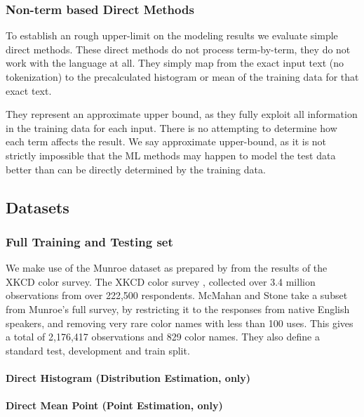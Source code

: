 \documentclass[11pt,a4paper]{article}
\newcommand{\parencite}{\citep}
\newcommand{\textcite}{\citet}
\begin{document}
\subsubsection{Non-term based Direct Methods}
To establish an rough upper-limit on the modeling results
we evaluate simple direct methods.
These direct methods do not process term-by-term, they do not work with the language at all.
They simply map from the exact input text (no tokenization) to the precalculated histogram or mean of the training data for that exact text.

They represent an approximate upper bound, as they fully exploit all information in the training data for each input.
There is no attempting to determine how each term affects the result.
We say approximate upper-bound, as it is not strictly impossible that the ML methods may happen to model the test data better than can be directly determined by the training data.
\subsection{Datasets}


\subsubsection{Full Training and Testing set}
We make use of the  Munroe dataset as prepared by \textcite{mcmahan2015bayesian} from the results of the XKCD color survey.
The XKCD color survey \parencite{Munroe2010XKCDdataset}, collected over 3.4 million observations from over 222,500 respondents.
McMahan and Stone take a subset from Munroe's full survey, by restricting it to the responses from native English speakers, 
and removing very rare color names with less than 100 uses.
This gives a total of 2,176,417 observations and 829 color names. 
They also define a standard test, development and train split.
\paragraph{Direct Histogram (Distribution Estimation, only)}
\paragraph{Direct Mean Point (Point Estimation, only)}
\end{document}
